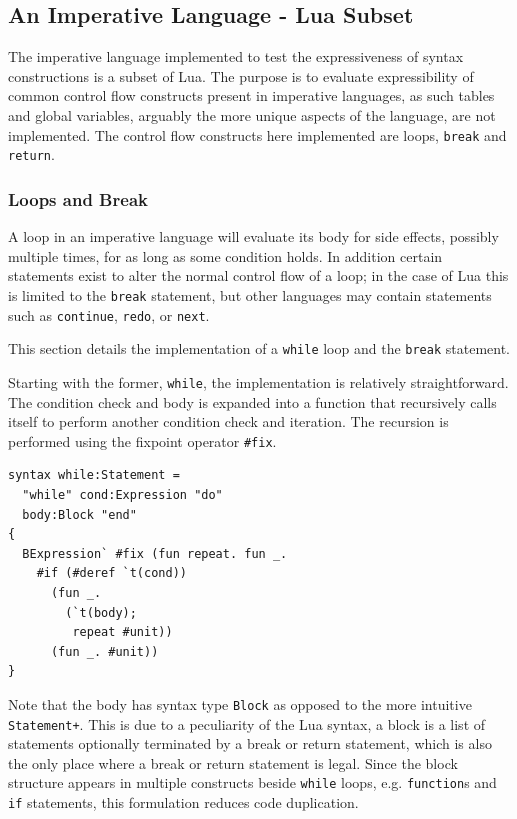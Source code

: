 \documentclass{kththesis}
\begin{document}
\subsection{An Imperative Language - Lua Subset} \label{sec:imperative-eval}

The imperative language implemented to test the expressiveness of syntax constructions is a subset of Lua. %
The purpose is to evaluate expressibility of common control flow constructs present in imperative languages, as such tables and global variables, arguably the more unique aspects of the language, are not implemented. The control flow constructs here implemented are loops, \texttt{break} and \texttt{return}.

\subsubsection{Loops and Break} \label{sec:lua-loops-and-break}

A loop in an imperative language will evaluate its body for side effects, possibly multiple times, for as long as some condition holds. In addition certain statements exist to alter the normal control flow of a loop; in the case of Lua this is limited to the \texttt{break} statement, but other languages may contain statements such as \texttt{continue}, \texttt{redo}, or \texttt{next}.

This section details the implementation of a \texttt{while} loop and the \texttt{break} statement.

Starting with the former, \texttt{while}, the implementation is relatively straightforward. The condition check and body is expanded into a function that recursively calls itself to perform another condition check and iteration. The recursion is performed using the fixpoint operator \texttt{#fix}.

\begin{verbatim}
syntax while:Statement =
  "while" cond:Expression "do"
  body:Block "end"
{
  BExpression` #fix (fun repeat. fun _.
    #if (#deref `t(cond))
      (fun _.
        (`t(body);
         repeat #unit))
      (fun _. #unit))
}
\end{verbatim}

Note that the body has syntax type \texttt{Block} as opposed to the more intuitive \texttt{Statement+}. This is due to a peculiarity of the Lua syntax, a block is a list of statements optionally terminated by a break or return statement, which is also the only place where a break or return statement is legal. Since the block structure appears in multiple constructs beside \texttt{while} loops, e.g. \texttt{function}s and \texttt{if} statements, this formulation reduces code duplication.
\end{document}
